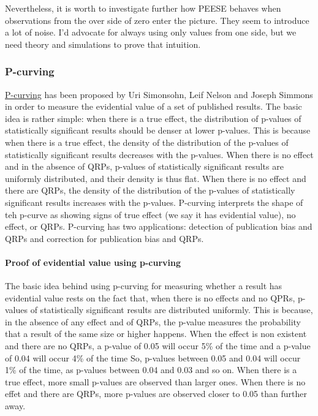 \documentclass[]{book}
\let\oldparagraph\paragraph
\renewcommand{\paragraph}[1]{\oldparagraph{#1}\mbox{}}
\theoremstyle{definition}
\theoremstyle{definition}
\theoremstyle{definition}
\theoremstyle{remark}
\begin{document}
Nevertheless, it is worth to investigate further how PEESE behaves when observations from the over side of zero enter the picture.
They seem to introduce a lot of noise.
I'd advocate for always using only values from one side, but we need theory and simulations to prove that intuition.

\hypertarget{p-curving}{%
\subsubsection{P-curving}\label{p-curving}}

\href{http://www.p-curve.com}{P-curving} has been proposed by Uri Simonsohn, Leif Nelson and Joseph Simmons in order to measure the evidential value of a set of published results.
The basic idea is rather simple: when there is a true effect, the distribution of p-values of statistically significant results should be denser at lower p-values.
This is because when there is a true effect, the density of the distribution of the p-values of statistically significant results decreases with the p-values.
When there is no effect and in the absence of QRPs, p-values of statistically significant results are uniformly distributed, and their density is thus flat.
When there is no effect and there are QRPs, the density of the distribution of the p-values of statistically significant results increases with the p-values.
P-curving interprets the shape of teh p-curve as showing signs of true effect (we say it has evidential value), no effect, or QRPs.
P-curving has two applications: detection of publication bias and QRPs and correction for publication bias and QRPs.

\hypertarget{proof-of-evidential-value-using-p-curving}{%
\paragraph{Proof of evidential value using p-curving}\label{proof-of-evidential-value-using-p-curving}}

The basic idea behind using p-curving for measuring whether a result has evidential value rests on the fact that, when there is no effects and no QPRs, p-values of statistically significant results are distributed uniformly.
This is because, in the absence of any effect and of QRPs, the p-value measures the probability that a result of the same size or higher happens.
When the effect is non existent and there are no QRPs, a p-value of 0.05 will occur 5\% of the time and a p-value of 0.04 will occur 4\% of the time
So, p-values between 0.05 and 0.04 will occur 1\% of the time, as p-values between 0.04 and 0.03 and so on.
When there is a true effect, more small p-values are observed than larger ones.
When there is no effet and there are QRPs, more p-values are observed closer to 0.05 than further away.
\end{document}
